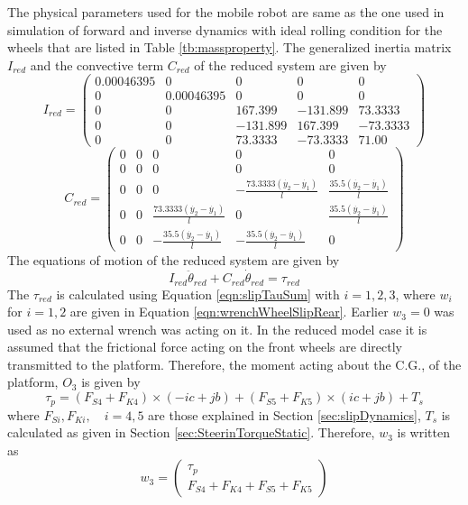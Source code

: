 {The physical parameters used for the mobile robot are same as the one used in simulation of forward and inverse dynamics with ideal rolling condition for the wheels that  are listed in Table \ref{tb:massproperty}.
The generalized inertia  matrix $I_{red}$  and the convective term $ C_{red}$ of the reduced system are given by
\begin{equation}
I_{red}=\left(
\begin{array}{ccccc}
0.00046395 & 0 & 0 & 0 & 0 \\
0 & 0.00046395 & 0 & 0 & 0 \\
0 & 0 & 167.399 & -131.899 & 73.3333 \\
0 & 0 & -131.899 & 167.399 & -73.3333 \\
0 & 0 & 73.3333 & -73.3333 & 71.00
\end{array}
\right)
\end{equation}
\begin{equation}
C_{red}=\left(
\begin{array}{ccccc}
0 & 0 & 0 & 0 & 0 \\
0 & 0 & 0 & 0 & 0 \\
0 & 0 & 0 & -\frac{73.3333 (\dot{y_2} - \dot{y_1})}{l} & \frac{35.5 (\dot{y_2} - \dot{y_1})}{l} \\
0 & 0 & \frac{73.3333 (\dot{y_2} - \dot{y_1})}{l} & 0 & \frac{35.5 (\dot{y_2} - \dot{y_1})}{l} \\
0 & 0 & -\frac{35.5 (\dot{y_2} - \dot{y_1})}{l} & -\frac{35.5 (\dot{y_2} - \dot{y_1})}{l} & 0
\end{array}
\right)
\end{equation}
The equations of motion of the reduced system are given by 
\begin{equation}
I_{red}\ddot{\theta}_{red}+C_{red}\dot{\theta}_{red}=\tau_{red}
\end{equation}
The $\tau_{red}$ is calculated using Equation \ref{eqn:slipTauSum} with $i=1,2,3 $, where $w_i$ for $ i=1,2$ are given in Equation \ref{eqn:wrenchWheelSlipRear}.
Earlier $w_3=0$ was used as no external wrench was acting on it. In the reduced model case it is assumed that the frictional force acting on the front wheels are directly transmitted to the platform. Therefore, the moment acting about the C.G., of the platform, $O_3$ is given by
\begin{equation}
 	\label{eqn:redPlatMoment}
 	\tau_{p}=(F_{S4}+F_{K4}) \times (-i c+jb) +(F_{S5}+F_{K5}) \times (i c+jb) +T_s
\end{equation}
where $F_{Si},F_{Ki},\quad i=4,5$ are those explained in Section \ref{sec:slipDynamics}, $T_s$ is calculated as given  in Section \ref{sec:SteerinTorqueStatic}.
Therefore, $w_3$ is written as 
\begin{equation}
w_3=\begin{pmatrix}
\tau_{p}\\
F_{S4}+F_{K4}+F_{S5}+F_{K5}
\end{pmatrix}
\end{equation}

}
